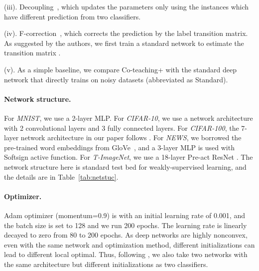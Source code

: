 \documentclass{article}
\begin{document}
(iii). Decoupling~\cite{malach2017decoupling}, which updates the parameters only using the instances which have different prediction from two
classifiers.

(iv). F-correction~\cite{patrini2017making}, which corrects the prediction by the label transition matrix. As suggested by the authors, we first train a standard network to estimate the transition matrix .

(v). As a simple baseline, we compare Co-teaching+ with the standard deep network that directly trains on noisy datasets (abbreviated as Standard).

\paragraph{Network structure.} For \textit{MNIST}, we use a 2-layer MLP. For \textit{CIFAR-10}, we use a network architecture with 2 convolutional layers and 3 fully connected layers. For \textit{CIFAR-100}, the 7-layer network architecture in our paper follows \cite{wang2018iterative}. For \textit{NEWS}, we borrowed the pre-trained word embeddings from GloVe~\cite{pennington2014glove}, and a 3-layer MLP is used with Softsign active function. For \textit{T-ImageNet}, we use a 18-layer Pre-act ResNet \cite{he2016identity}. The network structure here is standard test bed for weakly-supervised learning, and the details are in Table~\ref{tab:netstuc}.



\paragraph{Optimizer.} Adam optimizer (momentum=0.9) is with an initial learning rate of 0.001, and the batch size is set to 128 and we run 200 epochs. The learning rate is linearly decayed to zero from 80 to 200 epochs. As deep networks are highly nonconvex, even with the same network and optimization method, different initializations can lead to different local optimal. Thus, following \cite{malach2017decoupling}, we also take two networks with the same architecture but different initializations as two classifiers.
\end{document}
